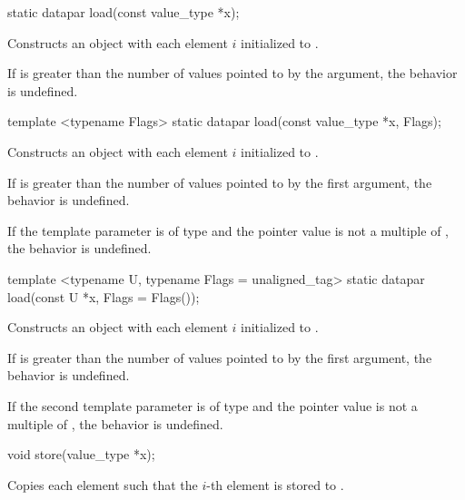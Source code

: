 \begin{wgText}
  \begin{itemdecl}
    static datapar load(const value_type *x);
  \end{itemdecl}
  \begin{itemdescr}
    \pnum
    \effects
    Constructs an object with each element $i$ initialized to .

    \pnum
    If \datapar{} is greater than the number of values pointed to by the argument, the behavior is undefined.
  \end{itemdescr}

  \begin{itemdecl}
    template <typename Flags> static datapar load(const value_type *x, Flags);
  \end{itemdecl}
  \begin{itemdescr}
    \pnum
    \effects
    Constructs an object with each element $i$ initialized to .

    \pnum
    If \datapar{} is greater than the number of values pointed to by the first argument, the behavior is undefined.

    \pnum
    If the template parameter is of type  and the pointer value is not a multiple of , the behavior is undefined.
  \end{itemdescr}

  \begin{itemdecl}
    template <typename U, typename Flags = unaligned_tag> static datapar load(const U *x, Flags = Flags());
  \end{itemdecl}
  \begin{itemdescr}
    \pnum
    \effects
    Constructs an object with each element $i$ initialized to .

    \pnum
    If \datapar{} is greater than the number of values pointed to by the first argument, the behavior is undefined.

    \pnum
    If the second template parameter is of type  and the pointer value is not a multiple of , the behavior is undefined.
  \end{itemdescr}

  \begin{itemdecl}
    void store(value_type *x);
  \end{itemdecl}
  \begin{itemdescr}
    \pnum \effects Copies each element such that the $i$-th element is stored to .


\end{itemdescr}
\end{wgText}
